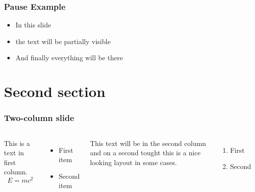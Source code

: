 \documentclass[aspectratio=169,t,xcolor=table]{beamer}
\begin{document}


\begin{frame}
\frametitle{Pause Example}

    \begin{itemize}
        \item In this slide \pause
        \item the text will be partially visible \pause
        \item And finally everything will be there
    \end{itemize}

\end{frame}



\section{Second section}

\begin{frame}
\frametitle{Two-column slide}

\begin{columns}

This is a text in first column.
$$E=mc^2$$
\begin{itemize}
\item First item
\item Second item
\end{itemize}

This text will be in the second column
and on a second tought this is a nice looking
layout in some cases.
\begin{enumerate}
    \item First
    \item Second
\end{enumerate}
\end{columns}
\end{frame}
\end{document}
